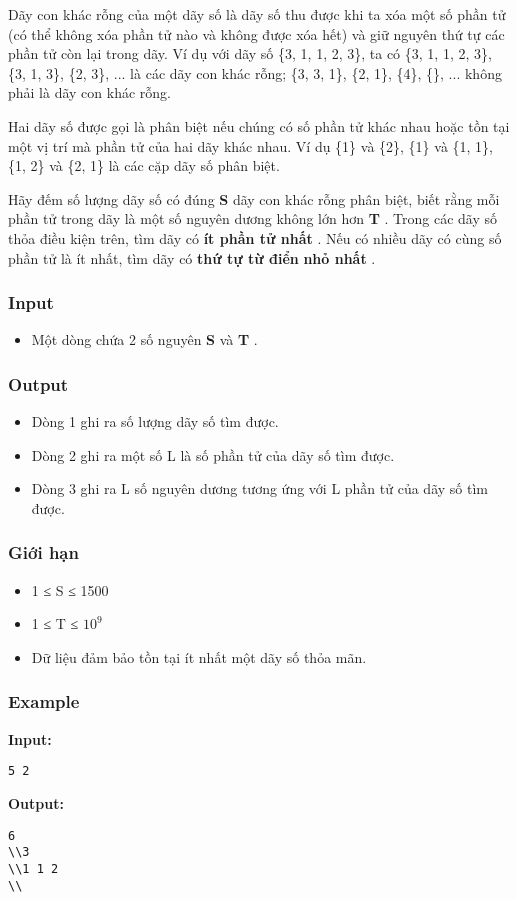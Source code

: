 



   Dãy con khác rỗng của một dãy số là dãy số thu được khi ta xóa một số phần tử (có thể không xóa phần tử nào và không được xóa hết) và giữ nguyên thứ tự các phần tử còn lại trong dãy. Ví dụ với dãy số \{3, 1, 1, 2, 3\}, ta có \{3, 1, 1, 2, 3\}, \{3, 1, 3\}, \{2, 3\}, ... là các dãy con khác rỗng; \{3, 3, 1\}, \{2, 1\}, \{4\}, \{\}, ... không phải là dãy con khác rỗng.  

   Hai dãy số được gọi là phân biệt nếu chúng có số phần tử khác nhau hoặc tồn tại một vị trí mà phần tử của hai dãy khác nhau. Ví dụ \{1\} và \{2\}, \{1\} và \{1, 1\}, \{1, 2\} và \{2, 1\} là các cặp dãy số phân biệt.  

   Hãy đếm số lượng dãy số có đúng   \textbf{    S   }   dãy con khác rỗng phân biệt, biết rằng mỗi phần tử trong dãy là một số nguyên dương không lớn hơn   \textbf{    T   }   . Trong các dãy số thỏa điều kiện trên, tìm dãy có   \textbf{    ít phần tử nhất   }   . Nếu có nhiều dãy có cùng số phần tử là ít nhất, tìm dãy có   \textbf{    thứ tự từ điển   }\textbf{    nhỏ nhất   }   .  

\subsubsection{   Input  }
\begin{itemize}
	\item     Một dòng chứa 2 số nguyên    \textbf{     S    }    và    \textbf{     T    }    .   
\end{itemize}

\subsubsection{   Output  }
\begin{itemize}
	\item     Dòng 1 ghi ra số lượng dãy số tìm được.   
	\item     Dòng 2 ghi ra một số L là số phần tử của dãy số tìm được.   
	\item     Dòng 3 ghi ra L số nguyên dương tương ứng với L phần tử của dãy số tìm được.   
\end{itemize}

\subsubsection{   Giới hạn  }
\begin{itemize}
	\item     1 ≤ S ≤ 1500   
	\item     1 ≤ T ≤ $10^{9}$
	\item     Dữ liệu đảm bảo tồn tại ít nhất một dãy số thỏa mãn.   
\end{itemize}

\subsubsection{   Example  }

\textbf{    Input:   }
\begin{verbatim}
5 2\end{verbatim}

\textbf{    Output:   }
\begin{verbatim}
6
\\3
\\1 1 2 
\\\end{verbatim}
